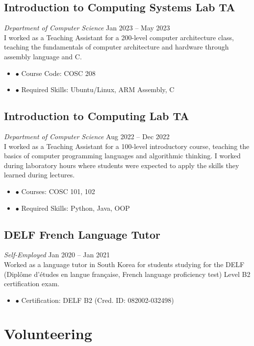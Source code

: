 \documentclass[11pt, letterpaper]{article}
\newenvironment{nitemize}{%
  \begin{itemize}[label={},topsep=0pt,itemsep=0pt,parsep=0pt,leftmargin=*]%
}{%
  \end{itemize}%
}
\begin{document}
\subsection{Introduction to Computing Systems Lab TA}
\noindent \emph{Department of Computer Science} \hfill Jan 2023 – May 2023\\
I worked as a Teaching Assistant for a 200-level computer architecture class, teaching the fundamentals of computer architecture and hardware through assembly language and C.
\begin{nitemize}
    \item \(\bullet\) Course Code: COSC 208
    \item \(\bullet\) Required Skills: Ubuntu/Linux, ARM Assembly, C
\end{nitemize}
\subsection{Introduction to Computing Lab TA}
\noindent \emph{Department of Computer Science} \hfill Aug 2022 – Dec 2022\\
I worked as a Teaching Assistant for a 100-level introductory course, teaching the basics of computer programming languages and algorithmic thinking. I worked during laboratory hours where students were expected to apply the skills they learned during lectures.
\begin{nitemize}
    \item \(\bullet\) Courses: COSC 101, 102
    \item \(\bullet\) Required Skills: Python, Java, OOP
\end{nitemize}

\subsection{DELF French Language Tutor}
\noindent \emph{Self-Employed} \hfill Jan 2020 – Jan 2021\\
Worked as a language tutor in South Korea for students studying for the DELF (Diplôme d’études en langue française, French language proficiency test) Level B2 certification exam.
\begin{nitemize}
    \item \(\bullet\) Certification: DELF B2 (Cred. ID: 082002-032498)
\end{nitemize}

\section{Volunteering}
\end{document}
